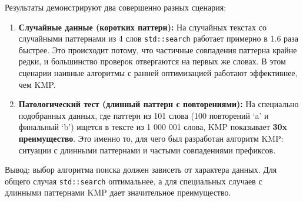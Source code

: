 Результаты демонстрируют два совершенно разных сценария:

\begin{enumerate}
    \item \textbf{Случайные данные (коротких паттерн):} На случайных текстах со случайными паттернами из 4 слов \texttt{std::search} работает примерно в 1.6 раза быстрее. Это происходит потому, что частичные совпадения паттерна крайне редки, и большинство проверок отвергаются на первых же словах. В этом сценарии наивные алгоритмы с ранней оптимизацией работают эффективнее, чем KMP.

    \item \textbf{Патологический тест (длинный паттерн с повторениями):} На специально подобранных данных, где паттерн из 101 слова (100 повторений `a' и финальный `b') ищется в тексте из 1 000 001 слова, KMP показывает \textbf{30x преимущество}. Это именно то, для чего был разработан алгоритм KMP: ситуации с длинными паттернами и частыми совпадениями префиксов.
\end{enumerate}

Вывод: выбор алгоритма поиска должен зависеть от характера данных. Для общего случая \texttt{std::search} оптимальнее, а для специальных случаев с длинными паттернами KMP дает значительное преимущество.

\pagebreak
